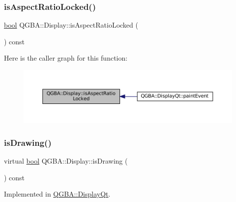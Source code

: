 \subsubsection{\texorpdfstring{is\+Aspect\+Ratio\+Locked()}{isAspectRatioLocked()}}
{\footnotesize\ttfamily \mbox{\hyperlink{libretro_8h_a4a26dcae73fb7e1528214a068aca317e}{bool}} Q\+G\+B\+A\+::\+Display\+::is\+Aspect\+Ratio\+Locked (\begin{DoxyParamCaption}{ }\end{DoxyParamCaption}) const\hspace{0.3cm}{\ttfamily [inline]}}

Here is the caller graph for this function\+:
\nopagebreak
\begin{figure}[H]
\begin{center}
\leavevmode
\includegraphics[width=350pt]{class_q_g_b_a_1_1_display_a3faa159946cd55ef4696cd2e7585ac42_icgraph}
\end{center}
\end{figure}
\mbox{\label{class_q_g_b_a_1_1_display_ace6799f5c31d1736c92033b2cf4daa31}} 
\subsubsection{\texorpdfstring{is\+Drawing()}{isDrawing()}}
{\footnotesize\ttfamily virtual \mbox{\hyperlink{libretro_8h_a4a26dcae73fb7e1528214a068aca317e}{bool}} Q\+G\+B\+A\+::\+Display\+::is\+Drawing (\begin{DoxyParamCaption}{ }\end{DoxyParamCaption}) const\hspace{0.3cm}{\ttfamily [pure virtual]}}



Implemented in \mbox{\hyperlink{class_q_g_b_a_1_1_display_qt_a7c01fcbb5a09686c2e0793039f810c05}{Q\+G\+B\+A\+::\+Display\+Qt}}.

